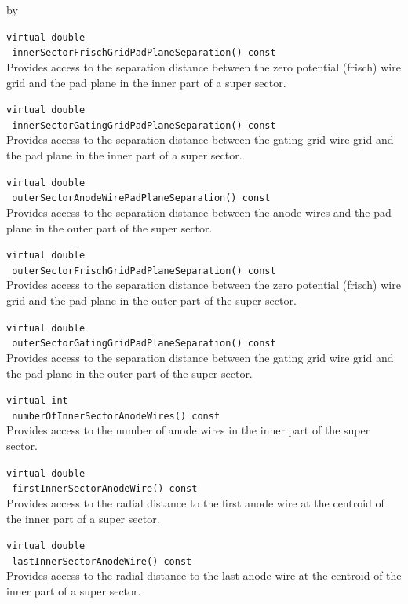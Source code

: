 \documentclass[twoside]{article}
\newcommand{\entrylabel}[1]{\mbox{\textbf{{#1}}}\hfil}%
\newenvironment{entry}
{\begin{list}{}%
    {\renewcommand{\makelabel}{\entrylabel}%
     \setlength{\labelwidth}{90pt}%
     \setlength{\leftmargin}{\labelwidth}
     \advance\leftmargin by \labelsep%
      }%
    }%
  {\end{list}}
\newcommand{\Entrylabel}[1]%
{\raisebox{0pt}[1ex][0pt]{\makebox[\labelwidth][l]%
    {\parbox[t]{\labelwidth}{\hspace{0pt}\textbf{{#1}}}}}}
\newenvironment{Entry}%
{\renewcommand{\entrylabel}{\Entrylabel}\begin{entry}}%
  {\end{entry}}
\begin{document}
\begin{Entry}
  \verb+virtual double+\\
  \verb+ innerSectorFrischGridPadPlaneSeparation() const+\\
  Provides access to the separation distance between the zero potential
  (frisch) wire grid and the pad plane in the inner part of a 
  super sector.

  \verb+virtual double+\\
  \verb+ innerSectorGatingGridPadPlaneSeparation() const+\\
  Provides access to the separation distance between the gating
  grid wire grid and the pad plane in the inner part 
  of a super sector.

  \verb+virtual double+\\
  \verb+ outerSectorAnodeWirePadPlaneSeparation() const+\\
  Provides access to the separation distance between the anode wires
  and the pad plane in the outer part of the super sector.

  \verb+virtual double+\\
  \verb+ outerSectorFrischGridPadPlaneSeparation() const+\\
  Provides access to the separation distance between the zero potential
  (frisch) wire grid and the pad plane in the outer part of 
  the super sector.
 
  \verb+virtual double+\\
  \verb+ outerSectorGatingGridPadPlaneSeparation() const+\\
  Provides access to the separation distance between the gating
  grid wire grid and the pad plane in the outer part 
  of the super sector.

  \verb+virtual int+\\
  \verb+ numberOfInnerSectorAnodeWires() const+\\
  Provides access to the number of anode wires in the inner part
  of the super sector.

  \verb+virtual double+\\
  \verb+ firstInnerSectorAnodeWire() const+\\
  Provides access to the radial distance to the first anode wire
  at the centroid of the inner part of a super sector.

  \verb+virtual double+\\
  \verb+ lastInnerSectorAnodeWire() const+\\
  Provides access to the radial distance to the last anode wire
  at the centroid of the inner part of a super sector.


\end{Entry}
\end{document}
